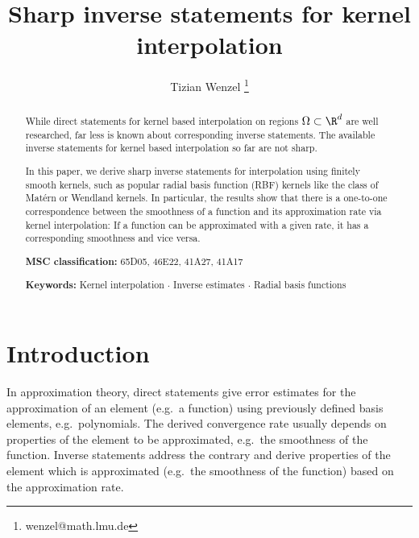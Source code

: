 \documentclass[a4paper, 10pt]{article}
\title{Sharp inverse statements for kernel interpolation}
\author[1,2]{Tizian Wenzel \thanks{wenzel@math.lmu.de}}
\affil[1]{Institute for Applied Analysis and Numerical Simulation, University of Stuttgart, Germany}
\affil[2]{Department of Mathematics, Ludwig-Maximilians-Universität München, Germany}
\begin{document}
\maketitle %



  
\begin{abstract}
%
%
%
%
%
%

%
While direct statements for kernel based interpolation on regions $\Omega \subset \R^d$ are well researched, 
far less is known about corresponding inverse statements.
The available inverse statements for kernel based interpolation so far are not sharp.

In this paper,
we derive sharp inverse statements for interpolation using finitely smooth kernels,
such as popular radial basis function (RBF) kernels like the class of Matérn or Wendland kernels.
In particular, the results show that there is a one-to-one correspondence between the smoothness of a function and its approximation rate via kernel interpolation: 
If a function can be approximated with a given rate, it has a corresponding smoothness and vice versa. \newline

%
%
%

%
%
\textbf{MSC classification:} 65D05, 46E22, 41A27, 41A17

%
\textbf{Keywords:} Kernel interpolation $\cdot$ Inverse estimates $\cdot$ Radial basis functions
\end{abstract}

%
%
%
%
%
%
%
%
 

%
%
%
%
%
%
%
%

%
 
%
%
%
%
%
%
%
%
%
%
%
%
%
%
%
%
%
%
%
%
%
%
%
%
%
%
%
%
%
%
%
%
%
%
%
%
%
%
%
%
%
%

%

\section{Introduction} \label{sec:introduction}

In approximation theory, direct statements give error estimates for the approximation of an element (e.g.\ a function) %
using previously defined basis elements, e.g.\ polynomials.
The derived convergence rate usually depends on properties of the element to be approximated, e.g.\ the smoothness of the function.
Inverse statements address the contrary and derive properties of the element which is approximated (e.g.\ the smoothness of the function) based on the approximation rate.
\end{document}

